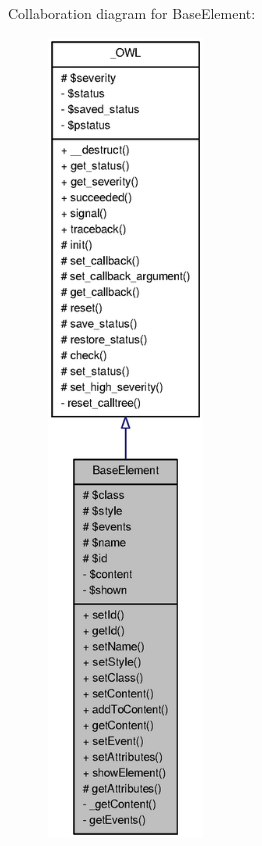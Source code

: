 Collaboration diagram for BaseElement:\nopagebreak
\begin{figure}[H]
\begin{center}
\leavevmode
\includegraphics[height=600pt]{classBaseElement__coll__graph}
\end{center}
\end{figure}
